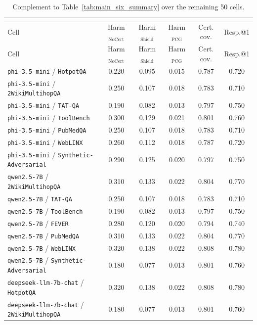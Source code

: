 \begin{longtable}{lccccc}
\caption{\small Complement to Table~\ref{tab:main_six_summary} over the remaining 50 cells.}\\
\label{tab:appendix_remaining_50_summary}\\
\toprule
Cell & Harm$_{\mathrm{NoCert}}$ & Harm$_{\mathrm{Shield}}$ & Harm$_{\mathrm{PCG}}$ & Cert. cov. & Resp.@1 \\
\midrule
\endfirsthead
\toprule
Cell & Harm$_{\mathrm{NoCert}}$ & Harm$_{\mathrm{Shield}}$ & Harm$_{\mathrm{PCG}}$ & Cert. cov. & Resp.@1 \\
\midrule
\endhead
\texttt{phi-3.5-mini} / \texttt{HotpotQA} & 0.220 & 0.095 & 0.015 & 0.787 & 0.720 \\
\texttt{phi-3.5-mini} / \texttt{2WikiMultihopQA} & 0.250 & 0.107 & 0.018 & 0.783 & 0.710 \\
\texttt{phi-3.5-mini} / \texttt{TAT-QA} & 0.190 & 0.082 & 0.013 & 0.797 & 0.750 \\
\texttt{phi-3.5-mini} / \texttt{ToolBench} & 0.300 & 0.129 & 0.021 & 0.801 & 0.760 \\
\texttt{phi-3.5-mini} / \texttt{PubMedQA} & 0.250 & 0.107 & 0.018 & 0.783 & 0.710 \\
\texttt{phi-3.5-mini} / \texttt{WebLINX} & 0.260 & 0.112 & 0.018 & 0.787 & 0.720 \\
\texttt{phi-3.5-mini} / \texttt{Synthetic-Adversarial} & 0.290 & 0.125 & 0.020 & 0.797 & 0.750 \\
\texttt{qwen2.5-7B} / \texttt{2WikiMultihopQA} & 0.310 & 0.133 & 0.022 & 0.804 & 0.770 \\
\texttt{qwen2.5-7B} / \texttt{TAT-QA} & 0.250 & 0.107 & 0.018 & 0.783 & 0.710 \\
\texttt{qwen2.5-7B} / \texttt{ToolBench} & 0.190 & 0.082 & 0.013 & 0.797 & 0.750 \\
\texttt{qwen2.5-7B} / \texttt{FEVER} & 0.280 & 0.120 & 0.020 & 0.794 & 0.740 \\
\texttt{qwen2.5-7B} / \texttt{PubMedQA} & 0.310 & 0.133 & 0.022 & 0.804 & 0.770 \\
\texttt{qwen2.5-7B} / \texttt{WebLINX} & 0.320 & 0.138 & 0.022 & 0.808 & 0.780 \\
\texttt{qwen2.5-7B} / \texttt{Synthetic-Adversarial} & 0.180 & 0.077 & 0.013 & 0.801 & 0.760 \\
\texttt{deepseek-llm-7b-chat} / \texttt{HotpotQA} & 0.320 & 0.138 & 0.022 & 0.808 & 0.780 \\
\texttt{deepseek-llm-7b-chat} / \texttt{2WikiMultihopQA} & 0.180 & 0.077 & 0.013 & 0.801 & 0.760 \\

\end{longtable}

